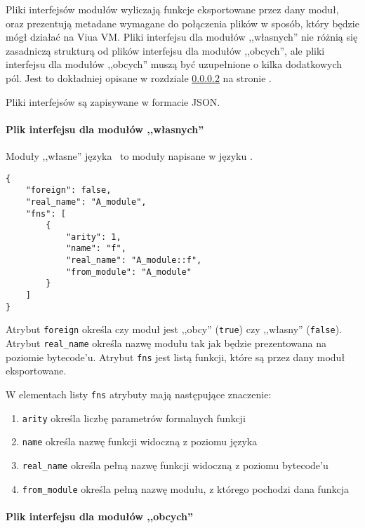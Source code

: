 Pliki interfejsów modułów wyliczają funkcje eksportowane przez dany moduł, oraz prezentują metadane wymagane
do połączenia plików w sposób, który będzie mógł działać na Viua VM. Pliki interfejsu dla modułów ,,własnych''
nie różnią się zasadniczą strukturą od plików interfejsu dla modułów ,,obcych'', ale pliki interfejsu dla
modułów ,,obcych'' muszą być uzupełnione o kilka dodatkowych pól. Jest to dokładniej opisane w rozdziale
\ref{pliki_interfejsow_modulow_obcych} na stronie \pageref{pliki_interfejsow_modulow_obcych}.

Pliki interfejsów są zapisywane w formacie JSON.

\paragraph{Plik interfejsu dla modułów ,,własnych''}

Moduły ,,własne'' języka \ViuAct\ to moduły napisane w języku \ViuAct.

\begin{small}
\begin{lstlisting}
{
    "foreign": false,
    "real_name": "A_module",
    "fns": [
        {
            "arity": 1,
            "name": "f",
            "real_name": "A_module::f",
            "from_module": "A_module"
        }
    ]
}
\end{lstlisting}
\end{small}

Atrybut \texttt{foreign} określa czy moduł jest ,,obcy'' (\texttt{true}) czy ,,własny'' (\texttt{false}).
Atrybut \texttt{real\_name} określa nazwę modułu tak jak będzie prezentowana na poziomie bytecode'u.
Atrybut \texttt{fns} jest listą funkcji, które są przez dany moduł eksportowane.

W elementach listy \texttt{fns} atrybuty mają następujące znaczenie:

\begin{enumerate}
    \item \texttt{arity} określa liczbę parametrów formalnych funkcji
    \item \texttt{name} określa nazwę funkcji widoczną z poziomu języka \ViuAct
    \item \texttt{real\_name} określa pełną nazwę funkcji widoczną z poziomu bytecode'u
    \item \texttt{from\_module} określa pełną nazwę modułu, z którego pochodzi dana funkcja
\end{enumerate}

\paragraph{Plik interfejsu dla modułów ,,obcych''}
\label{pliki_interfejsow_modulow_obcych}

